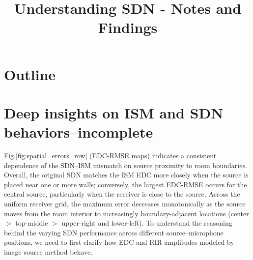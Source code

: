 \documentclass[conference]{IEEEtran}
\begin{document}
\title{Understanding SDN - Notes and Findings}
\maketitle

\section*{Outline}
\begin{enumerate}
\item {} 
\item {} 
\item {} 
\item {}
\textcolor{gray}{
\item {}
\item {}
\item {}
\item {}
\item {}}
\end{enumerate}

\newpage

\section{Deep insights on ISM and SDN behaviors--incomplete}
\label{sec:understanding}

Fig.\ref{fig:spatial_errors_row} (EDC-RMSE maps) indicates a consistent dependence of the SDN–ISM mismatch on source proximity to room boundaries. Overall, the original SDN matches the ISM EDC more closely when the source is placed near one or more walls; conversely, the largest EDC-RMSE occurs for the central source, particularly when the receiver is close to the source. Across the uniform receiver grid, the maximum error decreases monotonically as the source moves from the room interior to increasingly boundary-adjacent locations (center $>$ top-middle $>$ upper-right and lower-left). To understand the reasoning behind the varying SDN performance across different source–microphone positions, we need to first clarify how EDC and RIR amplitudes modeled by image source method behave.
\end{document}
